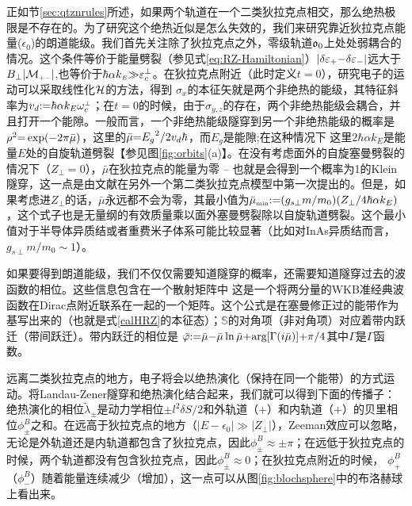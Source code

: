 正如节\ref{sec:qtznrules}所述，如果两个轨道在一个二类狄拉克点相交，那么绝热极限是不存在的。为了研究这个绝热近似是怎么失效的，我们来研究靠近狄拉克点能量($\epsilon_0$)的朗道能级。我们首先关注除了狄拉克点之外，零级轨道$\mathfrak{o}_0$上处处弱耦合的情况。这个条件等价于能量劈裂（参见式\ref{eq:RZ-Hamiltonian}）$|\delta \varepsilon_+{-}\delta \varepsilon_-|$远大于$B_\perp|{\cal M}_{\scriptscriptstyle{+-}}|$,也等价于$\hbar\alpha k_{\scriptscriptstyle{E}}{\gg}\varepsilon_c^\perp$。在狄拉克点附近（此时定义$t{=}0$），研究电子的运动可以采取线性化$\mathcal{H}$的方法，得到
$\sigma_x$的本征矢就是两个非绝热的能级，其特征斜率为$v_d{:}{=}\hbar\alpha k_E\omega^{\scriptscriptstyle{\perp}}_c$；在$t{=}0$的时候，由于$\sigma_{y,z}$的存在，两个非绝热能级会耦合，并且打开一个能隙。一般而言，一个非绝热能级隧穿到另一个非绝热能级的概率是$\rho^2{=}\exp(-2\pi\bar{\mu})$，这里的$\bar{\mu}{=}{E_g}^2/{2v_d \hbar}$，而$E_g$是能隙\cite{wittig_landauzener_2005,lifshitz_e.m._quantum_1991};在这种情况下
这里$2\hbar\alpha k_E$是能量$E$处的自旋轨道劈裂【参见图\ref{fig:orbits}(a)】。在没有考虑面外的自旋塞曼劈裂的情况下（$Z_\perp{=}0$），$\bar{\mu}$在狄拉克点的能量为零 -- 也就是会得到一个概率为1的Klein隧穿，这一点是由文献在另外一个第二类狄拉克点模型中第一次提出的。但是，如果考虑进$Z_\perp$的话，$\bar{\mu}$永远都不会为零，其最小值为$\bar{\mu}_{\scriptscriptstyle{\text{min}}}{:}{=} (g_{s\perp} m/m_0)(Z_\perp/4\hbar\alpha k_{E})$，这个式子也是无量纲的有效质量乘以面外塞曼劈裂除以自旋轨道劈裂。这个最小值对于半导体异质结或者重费米子体系可能比较显著（比如对InAs异质结而言，$g_{s\perp}m/m_0{\sim} 1$）。


如果要得到朗道能级，我们不仅仅需要知道隧穿的概率，还需要知道隧穿过去的波函数的相位。这些信息包含在一个散射矩阵中\cite{AALG,kaganov_coherent_1983}
这是一个将两分量的WKB准经典波函数在Dirac点附近联系在一起的一个矩阵。这个公式是在塞曼修正过的能带作为基写出来的（也就是式\ref{calHRZ}的本征态）；$\mathbb{S}$的对角项（非对角项）对应着带内跃迁（带间跃迁）。带内跃迁的相位是 $\bar{\varphi}{:}{=}\bar{\mu}{-}\bar{\mu}\ln\bar{\mu}{+}\text{arg}[\Gamma(i\bar{\mu})]{+}\pi/4$其中$\Gamma$是$\Gamma$函数。

远离二类狄拉克点的地方，电子将会以绝热演化（保持在同一个能带）的方式运动。将Landau-Zener隧穿和绝热演化结合起来，我们就可以得到下面的传播子：
绝热演化的相位$\tilde{\lambda}_{\pm}$是动力学相位${\pm} l^2 \delta S/2$和外轨道（$+$）和内轨道（$+$）的贝里相位$\phi^B_\pm$之和。在远高于狄拉克点的地方（$|E{-}\epsilon_0|{\gg}|Z_{\perp}|$），Zeeman效应可以忽略，无论是外轨道还是内轨道都包含了狄拉克点，因此$\phi_{\pm}^B{\approx}{\pm}\pi$；在远低于狄拉克点的时候，两个轨道都没有包含狄拉克点，因此$\phi_{\pm}^B{\approx}0$；在狄拉克点附近的时候， $\phi_{+}^B$（$\phi_{-}^B$）随着能量连续减少（增加），这一点可以从图\ref{fig:blochsphere}中的布洛赫球上看出来。

